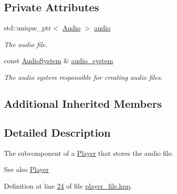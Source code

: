 \subsection*{Private Attributes}
\begin{DoxyCompactItemize}
\item 
\hypertarget{classPlayerFile_a649de02845f72a9d326b5942596ecd6b}{std\+::unique\+\_\+ptr$<$ \hyperlink{classAudio}{Audio} $>$ \hyperlink{classPlayerFile_a649de02845f72a9d326b5942596ecd6b}{audio}}\label{classPlayerFile_a649de02845f72a9d326b5942596ecd6b}

\begin{DoxyCompactList}\small\item\em The audio file. \end{DoxyCompactList}\item 
\hypertarget{classPlayerFile_a8de47bcb924e2c3e10b208a09eb3f05b}{const \hyperlink{classAudioSystem}{Audio\+System} \& \hyperlink{classPlayerFile_a8de47bcb924e2c3e10b208a09eb3f05b}{audio\+\_\+system}}\label{classPlayerFile_a8de47bcb924e2c3e10b208a09eb3f05b}

\begin{DoxyCompactList}\small\item\em The audio system responsible for creating audio files. \end{DoxyCompactList}\end{DoxyCompactItemize}
\subsection*{Additional Inherited Members}


\subsection{Detailed Description}
The subcomponent of a \hyperlink{classPlayer}{Player} that stores the audio file. 

\begin{DoxySeeAlso}{See also}
\hyperlink{classPlayer}{Player} 
\end{DoxySeeAlso}


Definition at line \hyperlink{player__file_8hpp_source_l00024}{24} of file \hyperlink{player__file_8hpp_source}{player\+\_\+file.\+hpp}.



